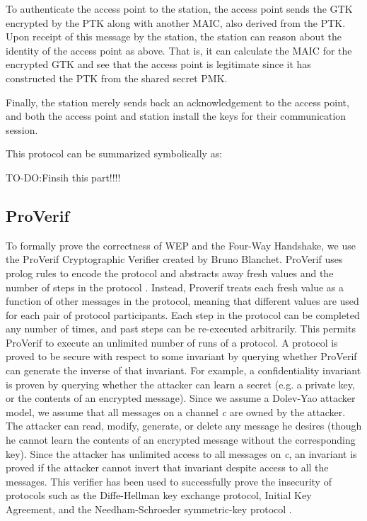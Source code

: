 \documentclass[11pt, twocolumn]{article} %
\begin{document}
{To authenticate the access point to the station, the access point sends the GTK encrypted by the PTK along with another MAIC, also derived from the PTK.  Upon receipt of this message by the station, the station can reason about the identity of the access point as above.  That is, it can calculate the MAIC for the encrypted GTK and see that the access point is legitimate since it has constructed the PTK from the shared secret PMK.  

Finally, the station merely sends back an acknowledgement to the access point, and both the access point and station install the keys for their communication session.  

This protocol can be summarized symbolically as: 

TO-DO:Finsih this part!!!!

\subsection{ProVerif}
To formally prove the correctness of WEP and the Four-Way Handshake, we use the ProVerif Cryptographic Verifier created by Bruno Blanchet.  ProVerif uses prolog rules to encode the protocol and abstracts away fresh values and the number of steps in the protocol \cite{blanchet01}.  Instead, Proverif treats each fresh value as a function of other messages in the protocol, meaning that different values are used for each pair of protocol participants.  Each step in the protocol can be completed any number of times, and past steps can be re-executed arbitrarily.  This permits ProVerif to execute an unlimited number of runs of a protocol.  A protocol is proved to be secure with respect to some invariant by querying  whether ProVerif can generate the inverse of that invariant.  For example, a confidentiality invariant is proven by querying whether the attacker can learn a secret (e.g. a private key, or the contents of an encrypted message). Since we assume a Dolev-Yao attacker model, we assume that all messages on a channel \textit{c} are owned by the attacker.  The attacker can read, modify, generate, or delete any message he desires (though he cannot learn the contents of an encrypted message without the corresponding key). Since the attacker has unlimited access to all messages on \textit{c}, an invariant is proved if the attacker cannot invert that invariant despite access to all the messages. This verifier has been used to successfully prove the insecurity of protocols such as the Diffe-Hellman key exchange protocol, Initial Key Agreement, and the Needham-Schroeder symmetric-key protocol \cite{lafourcade10, abadi}.

}
\end{document}
